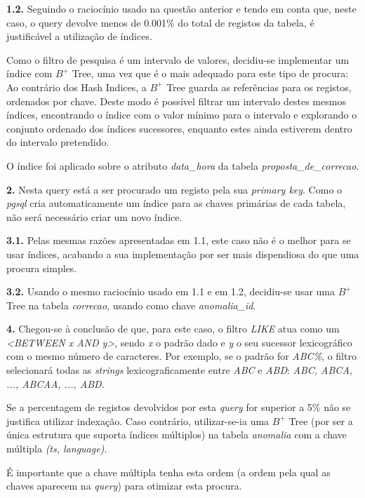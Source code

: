 \documentclass[12pt]{report}
\begin{document}
    \par \textbf{1.2.} Seguindo o raciocínio usado na questão anterior e tendo em conta que, neste caso, o query devolve menos de 0.001\% do total de registos da tabela, é justificável a utilização de índices.

    \par Como o filtro de pesquisa é um intervalo de valores, decidiu-se implementar um índice com $B^+$ Tree, uma vez que é o mais adequado para este tipo de procura: Ao contrário dos Hash Indices, a $B^+$ Tree guarda as referências para os registos, ordenados por chave. Deste modo é possível filtrar um intervalo destes mesmos índices, encontrando o índice com o valor mínimo para o intervalo e explorando o conjunto ordenado dos índices sucessores, enquanto estes ainda estiverem dentro do intervalo pretendido.
    \par O índice foi aplicado sobre o atributo \textit{{data\_hora}} da tabela \textit{proposta\_de\_correcao}.\\

    \par \textbf{2.} Nesta query está a ser procurado um registo pela sua \textit{primary key}. Como o \textit{pgsql} cria automaticamente um índice para as chaves primárias de cada tabela, não será necessário criar um novo índice.\\

    \par \textbf{3.1.} Pelas mesmas razões apresentadas em 1.1, este caso não é o melhor para se usar índices, acabando a sua implementação por ser mais dispendiosa do que uma procura simples.\\

    \par \textbf{3.2.} Usando o mesmo raciocínio usado em 1.1 e em 1.2, decidiu-se usar uma $B^+$ Tree na tabela \textit{correcao}, usando como chave \textit{anomalia\_id}.\\


    \par \textbf{4.} Chegou-se à conclusão de que, para este caso, o filtro \textit{LIKE} atua como um \textit{<BETWEEN x AND y>}, sendo \textit{x} o padrão dado e \textit{y} o seu sucessor lexicográfico com o mesmo número de caracteres. Por exemplo, se o padrão for \textit{ABC\%}, o filtro selecionará todas as \textit{strings} lexicograficamente entre \textit{ABC} e \textit{ABD}: \textit{ABC, ABCA, ..., ABCAA, ..., ABD}.

    \par Se a percentagem de registos devolvidos por esta \textit{query} for superior a 5\% não se justifica utilizar indexação. Caso contrário, utilizar-se-ia uma $B^+$ Tree (por ser a única estrutura que suporta índices múltiplos) na tabela \textit{anomalia} com a chave múltipla \textit{(ts, language)}.
    \par É importante que a chave múltipla tenha esta ordem (a ordem pela qual as chaves aparecem na \textit{query}) para otimizar esta procura.\\
\end{document}
